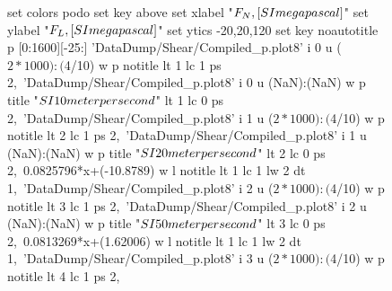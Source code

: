 \documentclass[5p]{elsarticle}
\begin{document}
\begin{figure}[htp]
    	\begin{center}
		\begin{gnuplot}[terminal=epslatex, terminaloptions={size \SERFigwidth cm, \SERFigheight cm color solid}]
		    set colors podo
			set key above
			set xlabel "$F_N \\, [\\SI{}{\\mega\\pascal}]$"
			set ylabel "$F_L \\, [\\SI{}{\\mega\\pascal}]$"
			set ytics -20,20,120
			set key noautotitle
p [0:1600][-25:] 'DataDump/Shear/Compiled_p.plot8' i 0  u ($2*1000):($4/10) w p notitle                                          lt 1 lc 1 ps 2,\
                 'DataDump/Shear/Compiled_p.plot8' i 0  u (NaN):(NaN) w p title "$\\SI{10}{\\meter\\per\\second}$"               lt 1 lc 0 ps 2,\
                 'DataDump/Shear/Compiled_p.plot8' i 1  u ($2*1000):($4/10) w p notitle                                          lt 2 lc 1 ps 2,\
                 'DataDump/Shear/Compiled_p.plot8' i 1  u (NaN):(NaN) w p title "$\\SI{20}{\\meter\\per\\second}$"               lt 2 lc 0 ps 2,\
                 0.0825796*x+(-10.8789)                                     w l notitle                                          lt 1 lc 1 lw 2 dt 1,\
                 'DataDump/Shear/Compiled_p.plot8' i 2  u ($2*1000):($4/10) w p notitle                                          lt 3 lc 1 ps 2,\
                 'DataDump/Shear/Compiled_p.plot8' i 2  u (NaN):(NaN) w p title "$\\SI{50}{\\meter\\per\\second}$"               lt 3 lc 0 ps 2,\
                 0.0813269*x+(1.62006)                                      w l notitle                                          lt 1 lc 1 lw 2 dt 1,\
                 'DataDump/Shear/Compiled_p.plot8' i 3  u ($2*1000):($4/10) w p notitle                                          lt 4 lc 1 ps 2,\

\end{gnuplot}
\end{center}
\end{figure}
\end{document}
